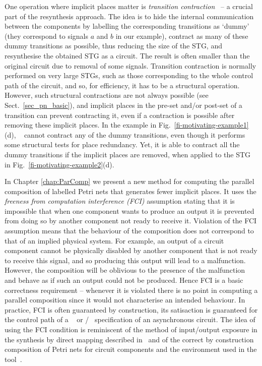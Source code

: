 One operation where implicit places matter is \emph{transition contraction}~\cite{vowo02lncs} -- a crucial part of the resynthesis approach. The idea is to hide the internal communication between the components by labelling the corresponding transitions as `dummy' (they correspond to signals $a$ and $b$ in our example), contract as many of these dummy transitions as possible, thus reducing the size of the STG, and resynthesise the obtained STG as a circuit. The result is often smaller than the original circuit due to removal of some signals. Transition contraction is normally performed on very large STGs, such as those corresponding to the whole control path of the circuit, and so, for efficiency, it has to be a structural operation. However, such structural contractions are not always possible (see Sect.~\ref{sec_pn_basic}), and implicit places in the pre-set and/or post-set of a transition can prevent contracting it, even if a contraction is possible after removing these implicit places. In the example in Fig.~\ref{fi-motivating-example1}(d), \desij~\cite{DesiJ} cannot contract any of the dummy transitions, even though it performs some structural tests for place redundancy. Yet, it is able to contract all the dummy transitions if the implicit places are removed, \ie when applied to the STG in Fig.~\ref{fi-motivating-example2}(d).

In Chapter \ref{chap:ParComp} we present a new method for computing the parallel composition of labelled Petri nets that generates fewer implicit places. It uses the \emph{freeness from computation interference (FCI)} assumption \cite{eber92} stating that it is impossible that when one component wants to produce an output it is prevented from doing so by another component not ready to receive it. Violation of the FCI assumption means that the behaviour of the composition does not correspond to that of an implied physical system. For example, an output of a circuit component cannot be physically disabled by another component that is not ready to receive this signal, and so producing this output will lead to a malfunction. However, the composition will be oblivious to the presence of the malfunction and behave as if such an output could not be produced.
Hence FCI is a basic correctness requirement -- whenever it is violated there is no point in computing a parallel composition since it would not characterise an intended behaviour. In practice, FCI is often guaranteed by construction, \eg its satisaction is guaranteed for the control path of a \balsa~\cite{EB-02} or \haste/\tangram~\cite{berkel91,haste-manual} specification of an asynchronous circuit. The idea of using the FCI condition is reminiscent of the method of input/output exposure in the synthesis by direct mapping described in~\cite{SBY-07} and of the correct by construction composition of Petri nets for circuit components and the environment used in the \ditopn tool~\cite{JF-00}.

